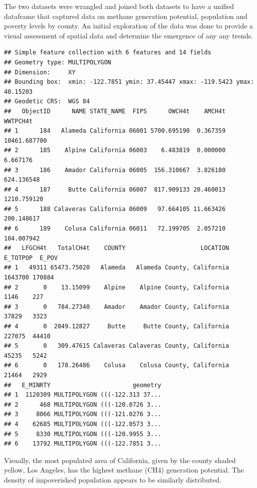 \documentclass[
  12pt,
]{article}
\begin{document}
The two datasets were wrangled and joined both datasets to have a
unified dataframe that captured data on methane generation potential,
population and poverty levels by county. An initial exploration of the
data was done to provide a visual assessment of spatial data and
determine the emergence of any any trends.

\begin{verbatim}
## Simple feature collection with 6 features and 14 fields
## Geometry type: MULTIPOLYGON
## Dimension:     XY
## Bounding box:  xmin: -122.7851 ymin: 37.45447 xmax: -119.5423 ymax: 40.15203
## Geodetic CRS:  WGS 84
##   ObjectID      NAME STATE_NAME  FIPS      OWCH4t    AMCH4t     WWTPCH4t
## 1      184   Alameda California 06001 5700.695190  0.367359 10461.687700
## 2      185    Alpine California 06003    6.483819  0.000000     6.667176
## 3      186    Amador California 06005  156.310667  3.826180   624.136548
## 4      187     Butte California 06007  817.909133 20.460013  1210.759120
## 5      188 Calaveras California 06009   97.664105 11.663426   200.148617
## 6      189    Colusa California 06011   72.199705  2.057210   104.007942
##   LFGCH4t   TotalCH4t    COUNTY                     LOCATION E_TOTPOP  E_POV
## 1   49311 65473.75020   Alameda   Alameda County, California  1643700 170884
## 2       0    13.15099    Alpine    Alpine County, California     1146    227
## 3       0   784.27340    Amador    Amador County, California    37829   3323
## 4       0  2049.12827     Butte     Butte County, California   227075  44410
## 5       0   309.47615 Calaveras Calaveras County, California    45235   5242
## 6       0   178.26486    Colusa    Colusa County, California    21464   2929
##   E_MINRTY                       geometry
## 1  1120309 MULTIPOLYGON (((-122.313 37...
## 2      468 MULTIPOLYGON (((-120.0726 3...
## 3     8066 MULTIPOLYGON (((-121.0276 3...
## 4    62685 MULTIPOLYGON (((-122.0573 3...
## 5     8330 MULTIPOLYGON (((-120.9955 3...
## 6    13792 MULTIPOLYGON (((-122.7851 3...
\end{verbatim}

Visually, the most populated area of California, given by the county
shaded yellow, Los Angeles, has the highest methane (CH4) generation
potential. The density of impoverished population appears to be
similarly distributed.
\end{document}

